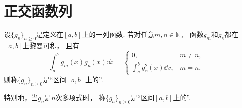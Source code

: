 \section{正交函数列}
\begin{definition}
设\(\{g_n\}_{n\geq0}\)是定义在\([a,b]\)上的一列函数.
若对任意\(m,n\in\mathbb{N}\)，
函数\(g_m\)和\(g_n\)都在\([a,b]\)上黎曼可积，
且有\[
	\int_a^b g_m(x) g_n(x) \dd{x} = \left\{ \begin{array}{ll}
		0, & m \neq n, \\
		\int_a^b g_n^2(x) \dd{x}, & m = n,
	\end{array} \right.
\]
则称\(\{g_n\}_{n\geq0}\)是“区间\([a,b]\)上的”.

特别地，当\(g_n\)是\(n\)次多项式时，
称\(\{g_n\}_{n\geq0}\)是“区间\([a,b]\)上的”.
\end{definition}

